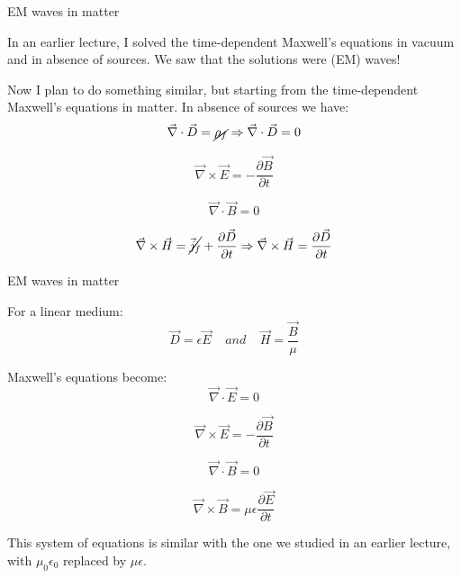 \begin{frame}{EM waves in matter}

In an earlier lecture, I solved the time-dependent Maxwell's equations in vacuum and in absence
of sources. We saw that the solutions were (EM) waves!\\

\vspace{0.2cm}

Now I plan to do something similar, but starting from the time-dependent Maxwell's
equations in matter. In absence of sources we have:\\
\begin{equation*}
    \vec{\nabla} \cdot \vec{D} = \cancel{\rho_f} \Rightarrow
    \vec{\nabla} \cdot \vec{D} = 0
\end{equation*}

\begin{equation*}
    \vec{\nabla} \times \vec{E} = -  \frac{\partial \vec{B}}{\partial t}
\end{equation*}

\begin{equation*}
    \vec{\nabla} \cdot \vec{B} = 0
\end{equation*}

\begin{equation*}
    \vec{\nabla} \times \vec{H} = \cancel{\vec{j}_f} + \frac{\partial \vec{D}}{\partial t} \Rightarrow
    \vec{\nabla} \times \vec{H} = \frac{\partial \vec{D}}{\partial t}
\end{equation*}

\end{frame}

%
%
%

\begin{frame}{EM waves in matter}

For a linear medium:
\begin{equation*}
         \vec{D} = \epsilon \vec{E} \;\;\;\; and \;\;\;\; \vec{H} = \frac{\vec{B}}{\mu}
\end{equation*}

Maxwell's equations become:
\begin{equation*}
    \vec{\nabla} \cdot \vec{E} = 0
\end{equation*}

\begin{equation*}
    \vec{\nabla} \times \vec{E} = -  \frac{\partial \vec{B}}{\partial t}
\end{equation*}

\begin{equation*}
    \vec{\nabla} \cdot \vec{B} = 0
\end{equation*}

\begin{equation*}
    \vec{\nabla} \times \vec{B} = \mu \epsilon \frac{\partial \vec{E}}{\partial t}
\end{equation*}

This system of equations is similar with the one we studied in an
earlier lecture, with  $\mu_0 \epsilon_0$ replaced by  $\mu \epsilon$.

\end{frame}

